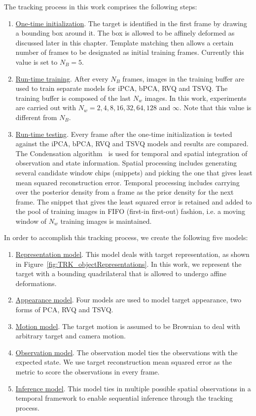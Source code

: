 The tracking process in this work comprises the following steps:

\begin{enumerate}
\item \underline{One-time initialization}.  The target is identified in the first frame by drawing a bounding box around it.  The box is allowed to be affinely deformed as discussed later in this chapter.  Template matching then allows a certain number of frames to be designated as initial training frames.  Currently this value is set to $N_B=5$. 

\item \underline{Run-time training}.  After every $N_B$ frames, images in the training buffer are used to train separate models for iPCA, bPCA, RVQ and TSVQ.  The training buffer is composed of the last $N_w$ images.  In this work, experiments are carried out with $N_w=2, 4, 8, 16, 32, 64, 128$ and $\infty$.  Note that this value is different from $N_B$.
  
\item \underline{Run-time testing}.  Every frame after the one-time initialization is tested against the iPCA, bPCA, RVQ and TSVQ models and results are compared.  The Condensation algorithm~\cite{1998_JNL_Condensation_IsardBlake} is used for temporal and spatial integration of observation and state information.  Spatial processing includes generating several candidate window chips (snippets) and picking the one that gives least mean squared reconstruction error.  Temporal processing includes carrying over the posterior density from a frame as the prior density for the next frame.  The snippet that gives the least squared error is retained and added to the pool of training images in FIFO (first-in first-out) fashion, i.e. a moving window of $N_w$ training images is maintained.
\end{enumerate}

In order to accomplish this tracking process, we create the following five models:

\begin{enumerate}
\item \underline{Representation model}.  This model deals with target representation, as shown in Figure~\ref{fig:TRK_objectRepresentations}.  In this work, we represent the target with a bounding quadrilateral that is allowed to undergo affine deformations.
\item \underline{Appearance model}.  Four models are used to model target appearance, two forms of PCA, RVQ and TSVQ.
\item \underline{Motion model}.  The target motion is assumed to be Brownian to deal with arbitrary target and camera motion.
\item \underline{Observation model}.  The observation model ties the observations with the expected state.  We use target reconstruction mean squared error as the metric to score the observations in every frame.
\item \underline{Inference model}.  This model ties in multiple possible spatial observations in a temporal framework to enable sequential inference through the tracking process.
\end{enumerate}

